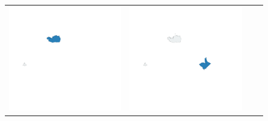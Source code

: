 \begin{figure}[p]
\begin{tabularx}{1\textwidth}{XXXX}
\includegraphics[width=1\linewidth]{images/ch6/loading/01}&
\includegraphics[width=1\linewidth]{images/ch6/loading/02}&

\end{tabularx}
\end{figure}
